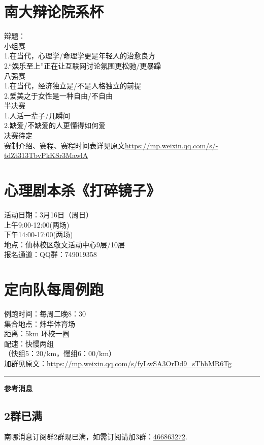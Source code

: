 \documentclass[letterpaper, 12pt]{article}
\begin{document}
\begin{multicols}{2}
\section{南大辩论院系杯}
辩题：\\
小组赛\\
1.在当代，心理学/命理学更是年轻人的治愈良方\\
2.“娱乐至上”正在让互联网讨论氛围更松驰/更暴躁\\
八强赛\\
1.在当代，经济独立是/不是人格独立的前提\\
2.爱美之于女性是一种自由/不自由\\
半决赛\\
1.人活一辈子/几瞬间\\
2.缺爱/不缺爱的人更懂得如何爱\\
决赛待定\\
赛制介绍、赛程、赛程时间表详见原文\url{https://mp.weixin.qq.com/s/-tdZt313TbvPkKSr3MawlA}

\section{心理剧本杀《打碎镜子》}
活动日期：3月16日（周日）\\
上午9:00-12:00(两场)\\
下午14:00-17:00(两场)\\
地点：仙林校区敬文活动中心9层/10层\\
报名通道：QQ群：749019358

\section{定向队每周例跑}
例跑时间：每周二晚8：30\\
集合地点：炜华体育场\\
距离：5km 环校一圈\\
配速：快慢两组\\
（快组5：20/km，慢组6：00/km）\\
加群见原文：\url{https://mp.weixin.qq.com/s/fyLwSA3OrDd9_sThhMR6Tg}


\end{multicols} 
\hrule
\vspace{4mm}
\centerline{\huge\textbf{参考消息}}
\begin{multicols}{2}
\section{2群已满}
南哪消息订阅群2群现已满，如需订阅请加3群：\href{https://qm.qq.com/q/4HL41Nt3sQ}{466863272}.

\end{multicols} 
\end{document}
